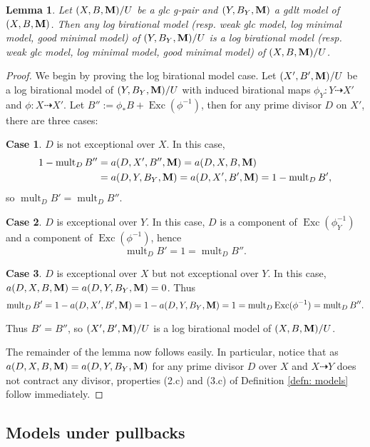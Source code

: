 \documentclass[11pt]{amsart}
\numberwithin{equation}{section}
\newcommand{\Mm}{{\bf{M}}}
\newcommand{\Exc}{\operatorname{Exc}}
\newcommand{\mult}{\operatorname{mult}}
\newtheorem{lem}[thm]{Lemma}
\theoremstyle{definition}
\theoremstyle{definition}
\theoremstyle{definition}
\begin{document}
\begin{lem}\label{lem: model keep under gdlt modification}
Let $(X,B,\Mm)/U$ be a glc g-pair and $(Y,B_Y,\Mm)$ a gdlt model of $(X,B,\Mm)$. Then any log birational model (resp. weak glc model, log minimal model, good minimal model) of $(Y,B_Y,\Mm)/U$ is a log birational model (resp. weak glc model, log minimal model, good minimal model) of $(X,B,\Mm)/U$.
\end{lem}
\begin{proof}
 We begin by proving the log birational model case. Let $(X',B',\Mm)/U$ be a log birational model of $(Y,B_Y,\Mm)/U$ with induced birational maps $\phi_Y: Y\dashrightarrow X'$ and $\phi: X\dashrightarrow X'$. Let $B'':=\phi_*B+\Exc(\phi^{-1})$, then for any prime divisor $D$ on $X'$, there are three cases:

\medskip

\noindent\textbf{Case 1}. $D$ is not exceptional over $X$. In this case,
\begin{align*}
    1-\mult_DB''&=a(D,X',B'',\Mm)=a(D,X,B,\Mm)\\
    &=a(D,Y,B_Y,\Mm)=a(D,X',B',\Mm)=1-\mult_DB',
\end{align*}
so $\mult_DB'=\mult_DB''$.

\medskip

\noindent\textbf{Case 2}. $D$ is exceptional over $Y$. In this case, $D$ is a component of $\Exc(\phi_Y^{-1})$ and a component of $\Exc(\phi^{-1})$, hence
$$\mult_DB'=1=\mult_DB''.$$

\medskip

\noindent\textbf{Case 3}. $D$ is exceptional over $X$ but not exceptional over $Y$. In this case, $a(D,X,B,\Mm)=a(D,Y,B_Y,\Mm)=0$. Thus
$$\mult_DB'=1-a(D,X',B',\Mm)=1-a(D,Y,B_Y,\Mm)=1=\mult_D\Exc(\phi^{-1})=\mult_DB''.$$

Thus $B'=B''$, so $(X',B',\Mm)/U$ is a log birational model of $(X,B,\Mm)/U$.

The remainder of the lemma now follows easily. In particular, notice that as  $a(D,X,B,\Mm)=a(D,Y,B_Y,\Mm)$ for any prime divisor $D$ over $X$ and $X\dashrightarrow Y$ does not contract any divisor, properties (2.c) and (3.c) of Definition \ref{defn: models} follow immediately.
\end{proof}








\subsection{Models under pullbacks}
\end{document}

